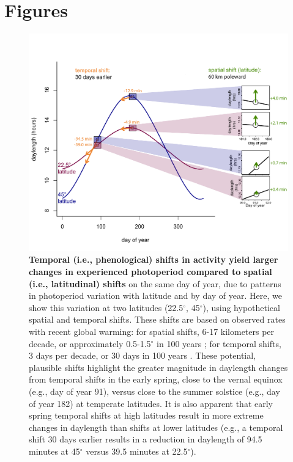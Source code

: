 \documentclass{article}
\begin{document}
\section* {Figures}

\begin{figure}[h]
\centering
\includegraphics{photo_spacetime_v4b_newcolors.pdf} %
\caption{\textbf{Temporal (i.e., phenological) shifts in activity yield larger changes in experienced photoperiod compared to spatial (i.e., latitudinal) shifts} on the same day of year, due to patterns in photoperiod variation with latitude and by day of year. Here, we show this variation at two latitudes (22.5$^{\circ}$, 45$^{\circ}$), using hypothetical spatial and temporal shifts. These shifts are based on observed rates with recent global warming: for spatial shifts, 6-17 kilometers per decade, or approximately 0.5-1.5$^{\circ}$ in 100 years \citep{parmesan2003,parmesan2006}; for temporal shifts, 3 days per decade, or 30 days in 100 years \citep{parmesan2006,chen2011}. These potential, plausible shifts highlight the greater magnitude in daylength changes from temporal shifts in the early spring, close to the vernal equinox (e.g., day of year 91), versus close to the summer solstice (e.g., day of year 182) at temperate latitudes.  It is also apparent that early spring temporal shifts at high latitudes result in more extreme changes in daylength than shifts at lower latitudes (e.g., a temporal shift 30 days earlier results in a reduction in daylength of 94.5 minutes at 45$^{\circ}$ versus 39.5 minutes at 22.5$^{\circ}$).}
 \label{fig:spacetime}%
 \end{figure}
 
\end{document}
